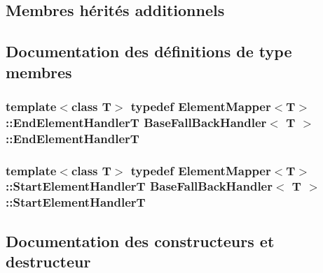 \subsection*{Membres hérités additionnels}


\subsection{Documentation des définitions de type membres}
\hypertarget{class_base_fall_back_handler_a8bc73d6cf9414a905eab6051beb1461e}{}
\subsubsection[{End\+Element\+Handler\+T}]{\setlength{\rightskip}{0pt plus 5cm}template$<$class T$>$ typedef {\bf Element\+Mapper}$<$T$>$\+::{\bf End\+Element\+Handler\+T} {\bf Base\+Fall\+Back\+Handler}$<$ T $>$\+::{\bf End\+Element\+Handler\+T}}\label{class_base_fall_back_handler_a8bc73d6cf9414a905eab6051beb1461e}
\hypertarget{class_base_fall_back_handler_ae0b24b5e229ec8d344add1a692d1df81}{}
\subsubsection[{Start\+Element\+Handler\+T}]{\setlength{\rightskip}{0pt plus 5cm}template$<$class T$>$ typedef {\bf Element\+Mapper}$<$T$>$\+::{\bf Start\+Element\+Handler\+T} {\bf Base\+Fall\+Back\+Handler}$<$ T $>$\+::{\bf Start\+Element\+Handler\+T}}\label{class_base_fall_back_handler_ae0b24b5e229ec8d344add1a692d1df81}


\subsection{Documentation des constructeurs et destructeur}
\hypertarget{class_base_fall_back_handler_a5397d4295b292dedacf8b50274622c36}{}
